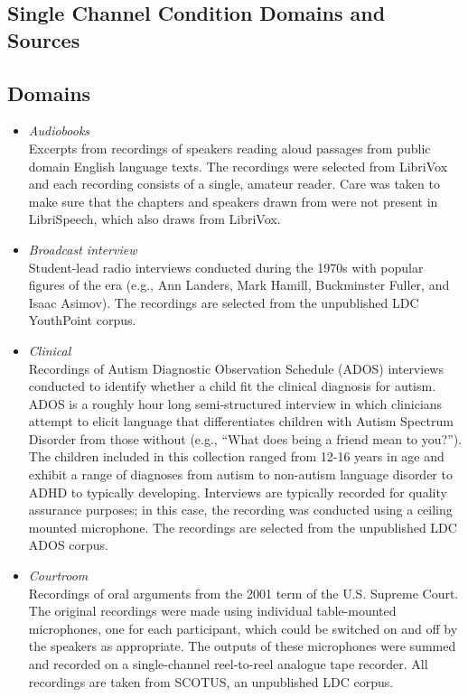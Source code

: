 \documentclass{article}
\begin{document}
\newpage
\begin{appendices}
\section{Single Channel Condition Domains and Sources}
\label{app:sources}

\subsection*{Domains}
    \begin{itemize}
        \item {\it Audiobooks} \\
            Excerpts from recordings of speakers reading aloud passages from public domain English language texts. The recordings were selected from LibriVox and each recording consists of a single, amateur reader. Care was taken to make sure that the chapters and speakers drawn from were not present in LibriSpeech, which also draws from LibriVox. 
        \item {\it Broadcast interview} \\
            Student-lead radio interviews conducted during the 1970s with popular figures of the era (e.g., Ann Landers, Mark Hamill, Buckminster Fuller, and Isaac Asimov). The recordings are selected from the unpublished LDC YouthPoint corpus.
        \item {\it Clinical} \\
            Recordings of Autism Diagnostic Observation Schedule (ADOS) interviews conducted to identify whether a child fit the clinical diagnosis for autism. ADOS is a roughly hour long semi-structured interview in which clinicians attempt to elicit language that differentiates children with Autism Spectrum Disorder from those without (e.g., ``What does being a friend mean to you?''). The children included in this collection ranged from 12-16 years in age and exhibit a range of diagnoses from autism to non-autism language disorder to ADHD to typically developing. Interviews are typically recorded for quality assurance purposes; in this case, the recording was conducted using a ceiling mounted microphone. The recordings are selected from the unpublished LDC ADOS corpus.
        \item {\it Courtroom} \\
            Recordings of oral arguments from the 2001 term of the U.S. Supreme Court. The original recordings were made using individual table-mounted microphones, one for each participant, which could be switched on and off by the speakers as appropriate. The outputs of these microphones were summed and recorded on a single-channel reel-to-reel analogue tape recorder. All recordings are taken from SCOTUS, an unpublished LDC corpus.

\end{itemize}
\end{appendices}
\end{document}
